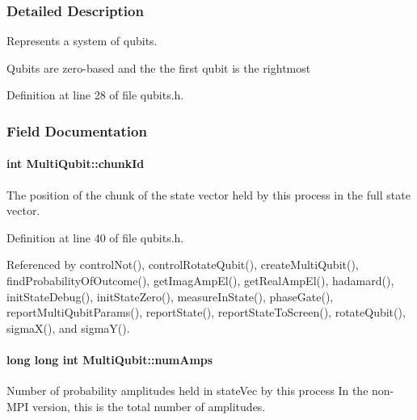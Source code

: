 \subsubsection{Detailed Description}
Represents a system of qubits. 

Qubits are zero-\/based and the the first qubit is the rightmost 

Definition at line 28 of file qubits.\+h.



\subsubsection{Field Documentation}
\paragraph[{\texorpdfstring{chunk\+Id}{chunkId}}]{\setlength{\rightskip}{0pt plus 5cm}int Multi\+Qubit\+::chunk\+Id}\hypertarget{structMultiQubit_ab10c88249fa3825d6227ceec01d37e37}{}\label{structMultiQubit_ab10c88249fa3825d6227ceec01d37e37}


The position of the chunk of the state vector held by this process in the full state vector. 



Definition at line 40 of file qubits.\+h.



Referenced by control\+Not(), control\+Rotate\+Qubit(), create\+Multi\+Qubit(), find\+Probability\+Of\+Outcome(), get\+Imag\+Amp\+El(), get\+Real\+Amp\+El(), hadamard(), init\+State\+Debug(), init\+State\+Zero(), measure\+In\+State(), phase\+Gate(), report\+Multi\+Qubit\+Params(), report\+State(), report\+State\+To\+Screen(), rotate\+Qubit(), sigma\+X(), and sigma\+Y().

\paragraph[{\texorpdfstring{num\+Amps}{numAmps}}]{\setlength{\rightskip}{0pt plus 5cm}long long int Multi\+Qubit\+::num\+Amps}\hypertarget{structMultiQubit_ae16f47d8b725c914fb7f66b6498d79db}{}\label{structMultiQubit_ae16f47d8b725c914fb7f66b6498d79db}


Number of probability amplitudes held in state\+Vec by this process In the non-\/\+M\+PI version, this is the total number of amplitudes. 



